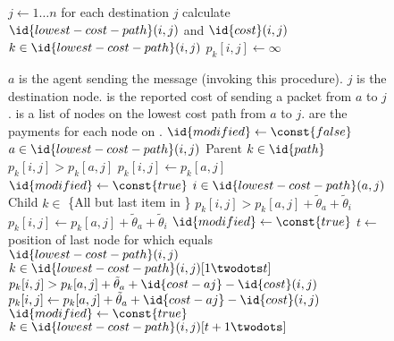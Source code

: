 \begin{SCfigure}
  \begin{minipage}{1.0\linewidth}
    \begin{codebox}
      \li \For $j \gets 1\ldots n$ \Comment for each destination $j$
      \li \Do calculate $\id{lowest-cost-path}(i,j)$
      and $\id{cost}(i,j)$
      \li   \For $k \in \id{lowest-cost-path}(i,j)$
      \li     \Do $p_k[i,j] \gets \infty$
              \End
          \End
    \end{codebox}
    \begin{codebox}
      \zi \Comment $a$ is the agent sending the message (invoking this
      procedure).
      \zi \Comment $j$ is the destination node.
      \zi \Comment {} is the reported cost of sending a packet
      from $a$ to $j$.
      \zi \Comment {} is a list of nodes on the lowest cost
      path from $a$ to $j$.
      \zi \Comment {} are the payments for each node on
      .
      \li $\id{modified} \gets \const{false}$
      \li \If $a \in \id{lowest-cost-path}(i,j)$ \Comment Parent
      \li \Then \For $k \in \id{path}$
      \li       \Do \If $p_k[i,j] > p_k[a,j]$
      \li           \Then $p_k[i,j] \gets p_k[a,j]$
      \li                 $\id{modified} \gets \const{true}$
                    \End
                \End
      \li \ElseIf $i \in \id{lowest-cost-path}(a,j)$ \Comment Child
      \li \Then \For $k \in $ \{All but last item in \}
      \li       \Do \If $p_k[i,j] > p_k[a,j] + \tilde{\theta}_a + \tilde{\theta}_i$
      \li           \Then $p_k[i,j] \gets p_k[a,j] + \tilde{\theta}_a
      + \tilde{\theta}_i$
      \li                 $\id{modified} \gets \const{true}$
                    \End
                \End
      \li \ElseNoIf 
      \li $t \gets $ position of last node for which 
      equals $\id{lowest-cost-path}(i,j)$
      \li     \For $k \in \id{lowest-cost-path}(i,j)[1\twodots t]$
      \li     \Do \If $p_k[i,j] > p_k[a,j] + \tilde{\theta}_a +
      \id{cost-aj} - \id{cost}(i,j)$
      \li         \Then $p_k[i,j] \gets p_k[a,j] + \tilde{\theta}_a +
      \id{cost-aj} - \id{cost}(i,j)$
      \li               $\id{modified} \gets \const{true}$
                  \End
              \End
      \li     \For $k \in \id{lowest-cost-path}(i,j)[t+1\twodots]$


\end{codebox}
\end{minipage}
\end{SCfigure}
